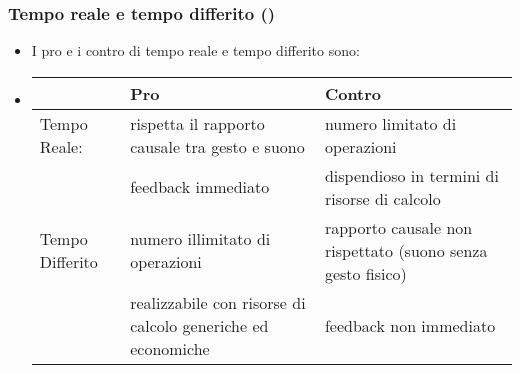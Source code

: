 \begin{frame}
    \frametitle{Tempo reale e tempo differito ()}

	\begin{itemize}[<+- | alert@+->]

		\item I pro e i contro di tempo reale e tempo differito sono:
		
    \item[~] {\scriptsize
			\begin{tabular}{| p{} | p{} | p{} |}
				\hline
					& {\centering\bfseries Pro} & {\centering\bfseries Contro}\\
				\hline
            Tempo Reale: & rispetta il rapporto causale
							   tra gesto e suono &
							   numero limitato di operazioni\\
							 & feedback immediato &
               dispendioso in termini di risorse di calcolo\\
				\hline
				Tempo Differito & numero illimitato di operazioni &
								  rapporto causale non rispettato
								  (suono senza gesto fisico)\\
							 & realizzabile con risorse di
							   calcolo generiche ed economiche &
                 feedback non immediato\\
        \hline
       \end{tabular}}

	\end{itemize}

\end{frame}
